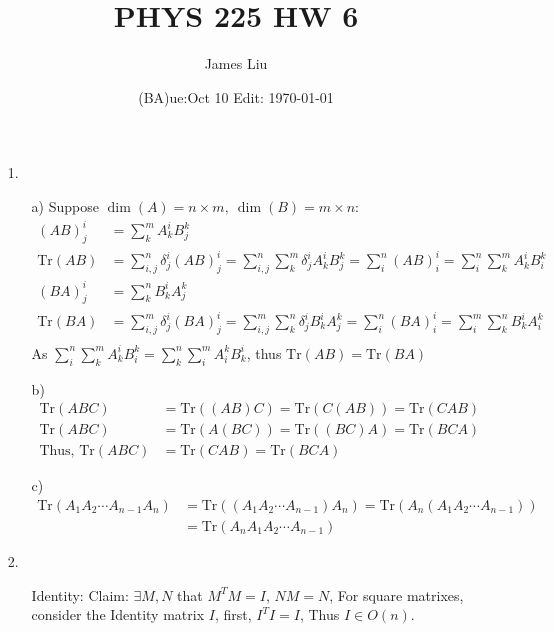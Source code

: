 \documentclass{article}
\date{(BA)ue:Oct 10 Edit: \today}
\title{PHYS 225 HW 6}
\author{James Liu}
\begin{document}
\maketitle
\begin{itemize}
    \item [1.] 
    \begin{itemize}
        \item [a)] Suppose \(\dim(A) = n\times m,\ \dim(B)=m\times n\):
        \begin{align*}
            (AB)^i_j &= \sum_{k}^m A^{i}_k B^k_j\\
            \text{Tr}(AB)& = \sum_{i,j}^n\delta^i_j(AB)^i_j = \sum_{i,j}^n\sum_{k}^m\delta^i_j A^{i}_k B^k_j = \sum_i^n (AB)^i_i = \sum_{i}^n\sum_{k}^m A^{i}_k B^k_i\\
            (BA)^i_j&= \sum_{k}^n B^i_kA^{k}_j \\
            \text{Tr}(BA)& = \sum_{i,j}^m\delta^i_j(BA)^i_j = \sum_{i,j}^m\sum_{k}^n\delta^i_j B^i_kA^{k}_j = \sum_i^n (BA)^i_i = \sum_i^m\sum_k^n B^i_kA_i^k\\        
        \end{align*}
        As \(\sum_{i}^n\sum_{k}^m A^{i}_k B^k_i =  \sum_k^n\sum_i^m A_i^kB^i_k\), thus \(\text{Tr}(AB) = \text{Tr}(BA)\)
        \item [b)]
        \begin{align*}
            \text{Tr}(ABC) &= \text{Tr}((AB)C)=\text{Tr}(C(AB))=\text{Tr}(CAB)\\
            \text{Tr}(ABC)&=\text{Tr}(A(BC))=\text{Tr}((BC)A)=\text{Tr}(BCA)\\
            \text{Thus, } \text{Tr}(ABC)&=\text{Tr}(CAB)=\text{Tr}(BCA)
        \end{align*}
        \item [c)]
        \begin{align*}
            \text{Tr}(A_1A_2\cdots A_{n-1}A_n)&=\text{Tr}((A_1A_2\cdots A_{n-1})A_n)=\text{Tr}(A_n(A_1A_2\cdots A_{n-1}))\\
            &=\text{Tr}(A_nA_1A_2\cdots A_{n-1})
        \end{align*}
    \end{itemize}
    \newpage
    \item [2.] \ 
        \begin{itemize}
            \item [Identity:] Claim: \(\exists M,N\) that \(M^TM = I\), \(NM = N\), For square matrixes, consider the Identity matrix \(I\), first, \(I^TI = I\), Thus \(I\in O(n)\).

\end{itemize}
\end{itemize}
\end{document}
